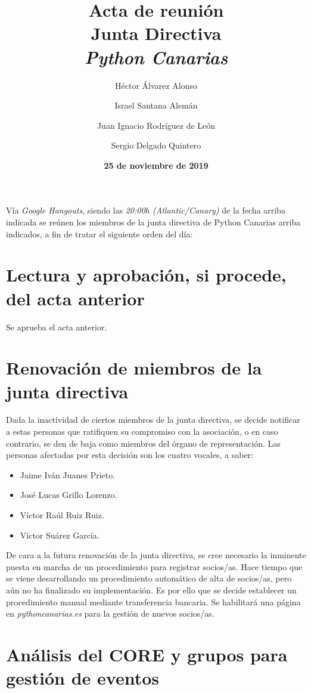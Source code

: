 \documentclass[a4paper, 12pt]{article}
\title{\huge \textbf{Acta de reunión} \\ Junta Directiva \\ \textit{Python Canarias}}
\date{\textbf{25 de noviembre de 2019}}
\author{
    Héctor Álvarez Alonso \and
    Israel Santana Alemán \and
    Juan Ignacio Rodríguez de León \and 
    Sergio Delgado Quintero
}
\begin{document}
\renewcommand{\contentsname}{Orden del día}

\maketitle

Vía \textit{Google Hangouts}, siendo las \textit{20:00h (Atlantic/Canary)} de la fecha arriba indicada se reúnen los miembros de la junta directiva de Python Canarias arriba indicados, a fin de tratar el siguiente orden del día:

\tableofcontents

\section{Lectura y aprobación, si procede, del acta anterior}

Se aprueba el acta anterior.

\section{Renovación de miembros de la junta directiva}

Dada la inactividad de ciertos miembros de la junta directiva, se decide notificar a estas personas que ratifiquen su compromiso con la asociación, o en caso contrario, se den de baja como miembros del órgano de representación. Las personas afectadas por esta decisión son los cuatro vocales, a saber:

\begin{itemize}
    \item Jaime Iván Juanes Prieto.
    \item José Lucas Grillo Lorenzo.
    \item Víctor Raúl Ruiz Ruiz.
    \item Víctor Suárez García.
\end{itemize}

De cara a la futura renovación de la junta directiva, se cree necesario la inminente puesta en marcha de un procedimiento para registrar socios/as. Hace tiempo que se viene desarrollando un procedimiento automático de alta de socios/as, pero aún no ha finalizado su implementación. Es por ello que se decide establecer un procedimiento manual mediante transferencia bancaria. Se habilitará una página en \textit{pythoncanarias.es} para la gestión de nuevos socios/as.

\section{Análisis del CORE y grupos para gestión de eventos}
\end{document}
